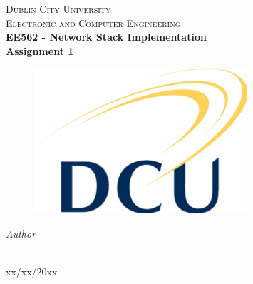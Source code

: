 \begin{titlepage}
  \begin{center}

    \textsc{\LARGE Dublin City University}\\[1cm]
    \textsc{\Large Electronic and Computer Engineering}\\[0.5cm]

    {\LARGE \bfseries EE562 - Network Stack Implementation\\[0.4cm]}
    {\Large \bfseries Assignment 1\\[0.4cm]}

    \begin{figure}[H]
	\includegraphics{images/Dcu-logo.png}
	\centering
    \end{figure}

    \vskip 2cm
    \emph{Author}\\[0.1cm]
    \noindent{}\\[0.1cm]

    \vfill

    {\large{xx/xx/20xx}}

  \end{center}
\end{titlepage}

